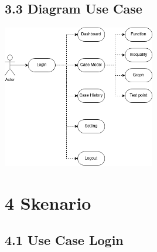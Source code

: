 \documentclass[a4paper]{article}
\begin{document}
    \subsection*{3.3 Diagram Use Case}
    \begin{center}
    \includegraphics[width=0.5\textwidth]{uml-Use Case.drawio.png}
    \end{center}
\section*{4 Skenario}
    \subsection*{4.1 Use Case Login}
\end{document}
